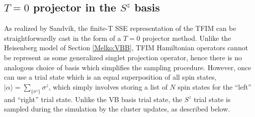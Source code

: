 \documentclass[vecphys]{svmult}
\begin{document}
\subsection{$T=0$ projector in the $S^z$ basis}

As realized by Sandvik, the finite-T SSE representation of the TFIM can be straightforwardly cast in the form of a $T=0$ projector method.  Unlike the Heisenberg model of Section \ref{Melko:VBB}, TFIM Hamiltonian operators cannot be represent as some generalized singlet projection operator, hence there is no analogous choice of basis which simplifies the sampling procedure.  However, once can use a trial state which is an equal superposition of all spin states, $| \alpha \rangle = \sum_{\{ \sigma^z \}} \sigma^z$, which simply involves storing a list of $N$ spin states for the ``left'' and ``right'' trial state.  Unlike the VB basis trial state, the $S^z$ trial state is sampled during the simulation by the cluster updates, as described below.
\end{document}

